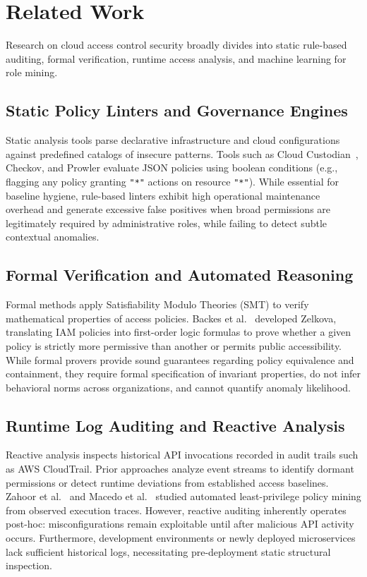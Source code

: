 \section{Related Work}
\label{sec:related}

Research on cloud access control security broadly divides into static rule-based auditing, formal verification, runtime access analysis, and machine learning for role mining.

\subsection{Static Policy Linters and Governance Engines}
Static analysis tools parse declarative infrastructure and cloud configurations against predefined catalogs of insecure patterns. Tools such as Cloud Custodian~\cite{cloudcustodian2023}, Checkov, and Prowler evaluate JSON policies using boolean conditions (e.g., flagging any policy granting \texttt{"*"} actions on resource \texttt{"*"}). While essential for baseline hygiene, rule-based linters exhibit high operational maintenance overhead and generate excessive false positives when broad permissions are legitimately required by administrative roles, while failing to detect subtle contextual anomalies.

\subsection{Formal Verification and Automated Reasoning}
Formal methods apply Satisfiability Modulo Theories (SMT) to verify mathematical properties of access policies. Backes et al.~\cite{backes2018semantic} developed Zelkova, translating IAM policies into first-order logic formulas to prove whether a given policy is strictly more permissive than another or permits public accessibility. While formal provers provide sound guarantees regarding policy equivalence and containment, they require formal specification of invariant properties, do not infer behavioral norms across organizations, and cannot quantify anomaly likelihood.

\subsection{Runtime Log Auditing and Reactive Analysis}
Reactive analysis inspects historical API invocations recorded in audit trails such as AWS CloudTrail. Prior approaches analyze event streams to identify dormant permissions or detect runtime deviations from established access baselines. Zahoor et al.~\cite{zahoor2022towards} and Macedo et al.~\cite{macedo2020least} studied automated least-privilege policy mining from observed execution traces. However, reactive auditing inherently operates post-hoc: misconfigurations remain exploitable until after malicious API activity occurs. Furthermore, development environments or newly deployed microservices lack sufficient historical logs, necessitating pre-deployment static structural inspection.

